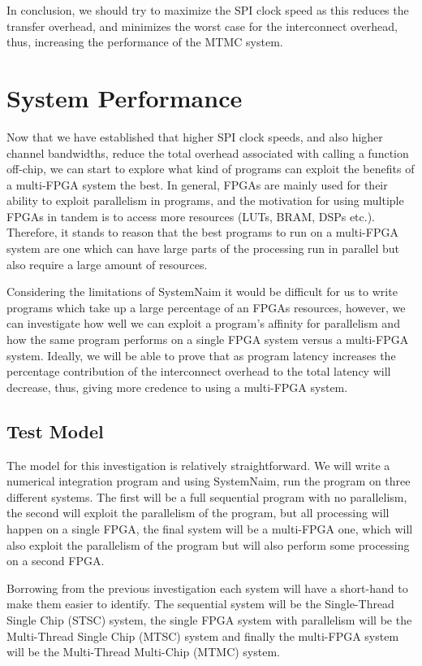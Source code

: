 In conclusion, we should try to maximize the SPI clock speed as this reduces the transfer overhead, and minimizes the worst case for the interconnect overhead, thus, increasing the performance of the MTMC system.

\section{System Performance}
\label{sec:sys_perf}

Now that we have established that higher SPI clock speeds, and also higher channel bandwidths, reduce the total overhead associated with calling a function off-chip, we can start to explore what kind of programs can exploit the benefits of a multi-FPGA system the best. In general, FPGAs are mainly used for their ability to exploit parallelism in programs, and the motivation for using multiple FPGAs in tandem is to access more resources (LUTs, BRAM, DSPs etc.). Therefore, it stands to reason that the best programs to run on a multi-FPGA system are one which can have large parts of the processing run in parallel but also require a large amount of resources.

Considering the limitations of SystemNaim it would be difficult for us to write programs which take up a large percentage of an FPGAs resources, however, we can investigate how well we can exploit a program's affinity for parallelism and how the same program performs on a single FPGA system versus a multi-FPGA system. Ideally, we will be able to prove that as program latency increases the percentage contribution of the interconnect overhead to the total latency will decrease, thus, giving more credence to using a multi-FPGA system.

\subsection{Test Model}

The model for this investigation is relatively straightforward. We will write a numerical integration program and using SystemNaim, run the program on three different systems. The first will be a full sequential program with no parallelism, the second will exploit the parallelism of the program, but all processing will happen on a single FPGA, the final system will be a multi-FPGA one, which will also exploit the parallelism of the program but will also perform some processing on a second FPGA.

Borrowing from the previous investigation each system will have a short-hand to make them easier to identify. The sequential system will be the Single-Thread Single Chip (STSC) system, the single FPGA system with parallelism will be the Multi-Thread Single Chip (MTSC) system and finally the multi-FPGA system will be the Multi-Thread Multi-Chip (MTMC) system.

